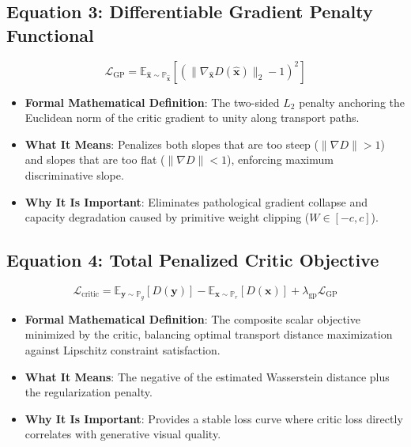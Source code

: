 \documentclass[11pt,a4paper]{article}
\theoremstyle{definition}
\begin{document}
\subsection{\textbf{Equation 3: Differentiable Gradient Penalty Functional}}
{\boldmath
\begin{equation}
\mathcal{L}_{\text{GP}} = \mathbb{E}_{\hat{\mathbf{x}} \sim \mathbb{P}_{\hat{\mathbf{x}}}}\left[ \left( \|\nabla_{\hat{\mathbf{x}}} D(\hat{\mathbf{x}})\|_2 - 1 \right)^2 \right]
\end{equation}
}
\begin{itemize}
    \item \textbf{Formal Mathematical Definition}:
    The two-sided $L_2$ penalty anchoring the Euclidean norm of the critic gradient to unity along transport paths.
    \item \textbf{What It Means}:
    Penalizes both slopes that are too steep ($\|\nabla D\| > 1$) and slopes that are too flat ($\|\nabla D\| < 1$), enforcing maximum discriminative slope.
    \item \textbf{Why It Is Important}:
    Eliminates pathological gradient collapse and capacity degradation caused by primitive weight clipping ($W \in [-c, c]$).
\end{itemize}

\subsection{\textbf{Equation 4: Total Penalized Critic Objective}}
{\boldmath
\begin{equation}
\mathcal{L}_{\text{critic}} = \mathbb{E}_{\mathbf{y} \sim \mathbb{P}_g}[D(\mathbf{y})] - \mathbb{E}_{\mathbf{x} \sim \mathbb{P}_r}[D(\mathbf{x})] + \lambda_{\text{gp}} \mathcal{L}_{\text{GP}}
\end{equation}
}
\begin{itemize}
    \item \textbf{Formal Mathematical Definition}:
    The composite scalar objective minimized by the critic, balancing optimal transport distance maximization against Lipschitz constraint satisfaction.
    \item \textbf{What It Means}:
    The negative of the estimated Wasserstein distance plus the regularization penalty.
    \item \textbf{Why It Is Important}:
    Provides a stable loss curve where critic loss directly correlates with generative visual quality.
\end{itemize}
\end{document}
